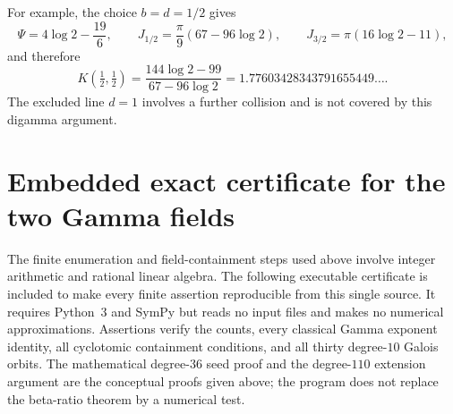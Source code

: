 \documentclass[11pt,a4paper]{article}
\theoremstyle{definition}
\theoremstyle{remark}
\numberwithin{equation}{section}
\begin{document}
For example, the choice $b=d=1/2$ gives
\[
 \Psi=4\log2-\frac{19}{6},\qquad
 J_{1/2}=\frac{\pi}{9}(67-96\log2),\qquad
 J_{3/2}=\pi(16\log2-11),
\]
and therefore
\[
 K(\tfrac12,\tfrac12)
 =\frac{144\log2-99}{67-96\log2}
 =1.77603428343791655449\ldots.
\]
The excluded line $d=1$ involves a further collision and is not
covered by this digamma argument.



\section{Embedded exact certificate for the two Gamma fields}
\label{fields-sec-certificate}
The finite enumeration and field-containment steps used above involve
integer arithmetic and rational linear algebra. The following executable
certificate is included to make every finite assertion reproducible from
this single source. It requires Python~3 and SymPy but reads no input
files and makes no numerical approximations. Assertions verify the
counts, every classical Gamma exponent identity, all cyclotomic
containment conditions, and all thirty degree-$10$ Galois orbits.
The mathematical degree-$36$ seed proof and the degree-$110$ extension
argument are the conceptual proofs given above; the program does not
replace the beta-ratio theorem by a numerical test.
\end{document}
